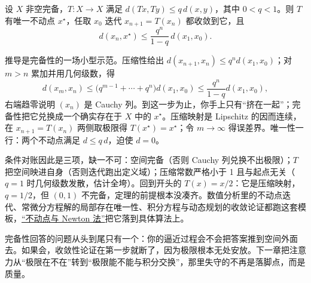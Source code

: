 \begin{theorem}
设 \(X\) 非空完备，\(T:X\to X\) 满足 \(d(Tx,Ty)\le q\,d(x,y)\)，其中 \(0<q<1\)。则 \(T\) 有唯一不动点 \(x^\star\)，任取 \(x_0\) 迭代 \(x_{n+1}=T(x_n)\) 都收敛到它，且
\[
d(x_n,x^\star)\le\frac{q^n}{1-q}\,d(x_1,x_0).
\]
\end{theorem}

推导是完备性的一场小型示范。压缩性给出 \(d(x_{n+1},x_n)\le q^n d(x_1,x_0)\)；对 \(m>n\) 累加并用几何级数，得
\[
d(x_m,x_n)\le\bigl(q^{m-1}+\cdots+q^n\bigr)d(x_1,x_0)\le\frac{q^n}{1-q}d(x_1,x_0),
\]
右端趋零说明 \((x_n)\) 是 Cauchy 列。到这一步为止，你手上只有``挤在一起''；完备性把它兑换成一个确实存在于 \(X\) 中的 \(x^\star\)。压缩映射是 Lipschitz 的因而连续，在 \(x_{n+1}=T(x_n)\) 两侧取极限得 \(T(x^\star)=x^\star\)；令 \(m\to\infty\) 得误差界。唯一性一行：两个不动点满足 \(d\le q\,d\)，迫使 \(d=0\)。

条件对账因此是三项，缺一不可：空间完备（否则 Cauchy 列兑换不出极限）；\(T\) 把空间映进自身（否则迭代跑出定义域）；压缩常数严格小于 1 且与起点无关（\(q=1\) 时几何级数发散，估计全垮）。回到开头的 \(T(x)=x/2\)：它是压缩映射，\(q=1/2\)，但 \((0,1)\) 不完备，定理的前提根本没凑齐。数值分析里的不动点迭代、常微分方程解的局部存在唯一性、积分方程与动态规划的收敛论证都跑这套模板，\hyperref[sec:08-Numerical-Analysis/02-Root-Finding/02]{``不动点与 Newton 法''}把它落到具体算法上。

完备性回答的问题从头到尾只有一个：你的逼近过程会不会把答案推到空间外面去。如果会，收敛性论证在第一步就断了，因为极限根本无处安放。下一章把注意力从``极限在不在''转到``极限能不能与积分交换''，那里失守的不再是落脚点，而是质量。
